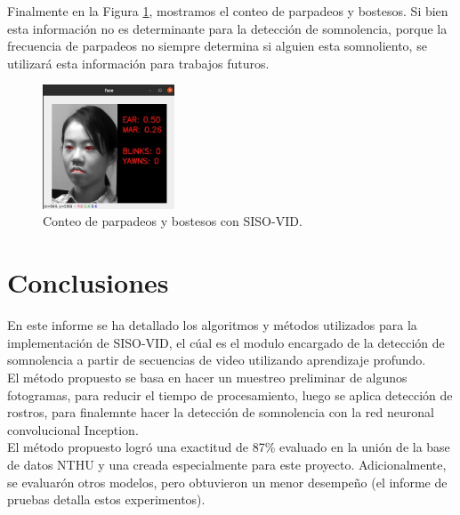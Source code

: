 \documentclass{article}
\begin{document}
	Finalmente en la Figura \ref{fig:ear_mar}, mostramos el conteo de parpadeos y bostesos. Si bien esta información no es determinante para la detección de somnolencia, porque la frecuencia de parpadeos no siempre determina si alguien esta somnoliento, se utilizará esta información para trabajos futuros.
	
	
	\begin{figure}[H]
		\centering
		\includegraphics[width=0.35\textwidth]{img/sisi_vid13}		
		\caption{Conteo de parpadeos y bostesos con SISO-VID.}
		\label{fig:ear_mar}	
	\end{figure}
	
	\section{Conclusiones}
	En este informe se ha detallado los algoritmos y métodos utilizados para la implementación de SISO-VID, el cúal es el modulo encargado de la detección de somnolencia a partir de secuencias de video utilizando aprendizaje profundo.\\
	
	El método propuesto se basa en hacer un muestreo preliminar de algunos fotogramas, para reducir el tiempo de procesamiento, luego se aplica detección de rostros, para finalemnte hacer la detección de somnolencia con la red neuronal convolucional Inception.\\
	
	El método propuesto logró una exactitud de 87\% evaluado en la unión de la base de datos NTHU y una creada especialmente para este proyecto. Adicionalmente, se evaluarón otros modelos, pero obtuvieron un menor desempeño (el informe de pruebas detalla estos experimentos).\\ 

	
\end{document}
